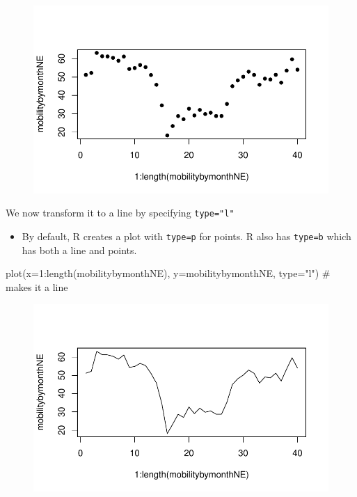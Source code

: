 \documentclass[
  letterpaper,
  DIV=11,
  numbers=noendperiod]{scrreprt}
\newenvironment{Shaded}{\begin{snugshade}}{\end{snugshade}}
\newcommand{\AttributeTok}[1]{\textcolor[rgb]{0.40,0.45,0.13}{#1}}
\newcommand{\CommentTok}[1]{\textcolor[rgb]{0.37,0.37,0.37}{#1}}
\newcommand{\DecValTok}[1]{\textcolor[rgb]{0.68,0.00,0.00}{#1}}
\newcommand{\FunctionTok}[1]{\textcolor[rgb]{0.28,0.35,0.67}{#1}}
\newcommand{\NormalTok}[1]{\textcolor[rgb]{0.00,0.23,0.31}{#1}}
\newcommand{\SpecialCharTok}[1]{\textcolor[rgb]{0.37,0.37,0.37}{#1}}
\newcommand{\StringTok}[1]{\textcolor[rgb]{0.13,0.47,0.30}{#1}}
\providecommand{\tightlist}{%
  \setlength{\itemsep}{0pt}\setlength{\parskip}{0pt}}\usepackage{longtable,booktabs,array}
\begin{document}
\begin{figure}[H]

{\centering \includegraphics{05-Causalityii_files/figure-pdf/unnamed-chunk-12-1.pdf}

}

\end{figure}

We now transform it to a line by specifying \texttt{type="l"}

\begin{itemize}
\tightlist
\item
  By default, R creates a plot with \texttt{type=p} for points. R also
  has \texttt{type=b} which has both a line and points.
\end{itemize}

\begin{Shaded}
\begin{Highlighting}[]
\FunctionTok{plot}\NormalTok{(}\AttributeTok{x=}\DecValTok{1}\SpecialCharTok{:}\FunctionTok{length}\NormalTok{(mobilitybymonthNE),}
     \AttributeTok{y=}\NormalTok{mobilitybymonthNE, }\AttributeTok{type=}\StringTok{"l"}\NormalTok{) }\CommentTok{\# makes it a line}
\end{Highlighting}
\end{Shaded}

\begin{figure}[H]

{\centering \includegraphics{05-Causalityii_files/figure-pdf/unnamed-chunk-13-1.pdf}

}

\end{figure}
\end{document}
